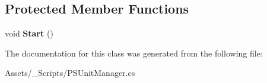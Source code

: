 \subsection*{Protected Member Functions}
\begin{DoxyCompactItemize}
\item 
\mbox{\label{class_p_s_flocking_1_1_p_s_unit_manager_a5ddc6c91220d066b472093428b21ee2b}} 
void {\bfseries Start} ()
\end{DoxyCompactItemize}


The documentation for this class was generated from the following file\+:\begin{DoxyCompactItemize}
\item 
Assets/\+\_\+\+Scripts/P\+S\+Unit\+Manager.\+cs\end{DoxyCompactItemize}
